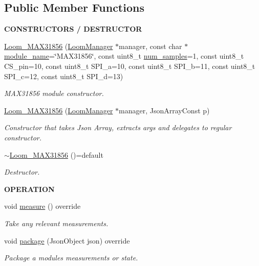 \subsection*{Public Member Functions}
\begin{Indent}{\bf C\+O\+N\+S\+T\+R\+U\+C\+T\+O\+RS / D\+E\+S\+T\+R\+U\+C\+T\+OR}\par
\begin{DoxyCompactItemize}
\item 
\hyperlink{class_loom___m_a_x31856_a30691d9af3fdaea41d7ab1a59b82a3ed}{Loom\+\_\+\+M\+A\+X31856} (\hyperlink{class_loom_manager}{Loom\+Manager} $\ast$manager, const char $\ast$\hyperlink{class_loom_module_adf6e68ad7e9fa2acfca7a8a280680764}{module\+\_\+name}=\char`\"{}M\+A\+X31856\char`\"{}, const uint8\+\_\+t \hyperlink{class_loom_sensor_a0e74ebbaecde15ed1c71e1bb6bc6aebe}{num\+\_\+samples}=1, const uint8\+\_\+t C\+S\+\_\+pin=10, const uint8\+\_\+t S\+P\+I\+\_\+a=10, const uint8\+\_\+t S\+P\+I\+\_\+b=11, const uint8\+\_\+t S\+P\+I\+\_\+c=12, const uint8\+\_\+t S\+P\+I\+\_\+d=13)
\begin{DoxyCompactList}\small\item\em M\+A\+X31856 module constructor. \end{DoxyCompactList}\item 
\hyperlink{class_loom___m_a_x31856_a0bec06c710f5a780dea73e433b4d61a2}{Loom\+\_\+\+M\+A\+X31856} (\hyperlink{class_loom_manager}{Loom\+Manager} $\ast$manager, Json\+Array\+Const p)
\begin{DoxyCompactList}\small\item\em Constructor that takes Json Array, extracts args and delegates to regular constructor. \end{DoxyCompactList}\item 
\hyperlink{class_loom___m_a_x31856_a2deb67e74947a53023a4ec8afe78bd45}{$\sim$\+Loom\+\_\+\+M\+A\+X31856} ()=default
\begin{DoxyCompactList}\small\item\em Destructor. \end{DoxyCompactList}\end{DoxyCompactItemize}
\end{Indent}
\begin{Indent}{\bf O\+P\+E\+R\+A\+T\+I\+ON}\par
\begin{DoxyCompactItemize}
\item 
void \hyperlink{class_loom___m_a_x31856_a3f5f043e751a0f3ce3e7090d872637ae}{measure} () override
\begin{DoxyCompactList}\small\item\em Take any relevant measurements. \end{DoxyCompactList}\item 
void \hyperlink{class_loom___m_a_x31856_a7b2d2b233930c75207c1a6521927ee74}{package} (Json\+Object json) override
\begin{DoxyCompactList}\small\item\em Package a modules measurements or state. \end{DoxyCompactList}\end{DoxyCompactItemize}
\end{Indent}
